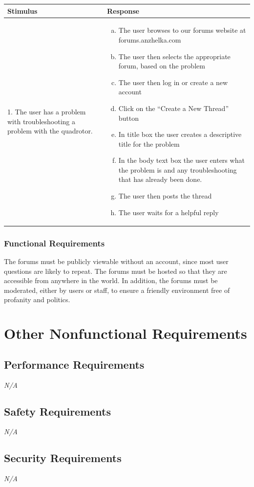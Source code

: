 \documentclass[english]{article}
\numberwithin{equation}{section} %
\begin{document}
\begin{tabular}{p{3cm} | p{8.5cm}}
\hline
\textbf{Stimulus} & \textbf{Response}\\
\hline
1. The user has a problem with troubleshooting a problem with the quadrotor. &
\begin{enumerate}[(a)]\itemsep1pt %
\item The user browses to our forums website at forums.anzhelka.com
\item The user then selects the appropriate forum, based on the problem
\item The user then log in or create a new account
\item Click on the ``Create a New Thread'' button
\item In title box the user creates a descriptive title for the problem
\item In the body text box the user enters what the problem is and any troubleshooting that has already been done.
\item The user then posts the thread
\item The user waits for a helpful reply
\end{enumerate}
\\ 
\hline
\end{tabular}
\subsubsection{Functional Requirements}
The forums must be publicly viewable without an account, since most user questions are likely to repeat. The forums must be hosted so that they are accessible from anywhere in the world. In addition, the forums must be moderated, either by users or staff, to ensure a friendly environment free of profanity and politics.


\newpage
\section{Other Nonfunctional Requirements}

\subsection{Performance Requirements}
\textit{N/A}
\subsection{Safety Requirements}
\textit{N/A}
\subsection{Security Requirements}
\textit{N/A}
\end{document}
